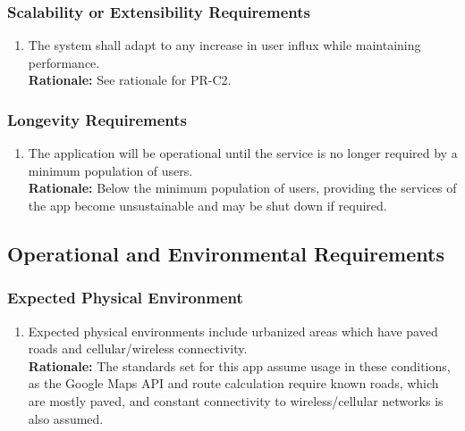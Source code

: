 \documentclass[]{article}
\begin{document}
\subsubsection{Scalability or Extensibility Requirements}
\label{ssub:scalability_or_extensibility_requirements}
\begin{enumerate}[{PR-SE}1. ]
	\item The system shall adapt to any increase in user influx while maintaining performance.\\
	{\bf Rationale:} See rationale for PR-C2.
\end{enumerate}

\subsubsection{Longevity Requirements}
\label{ssub:longevity_requirements}
\begin{enumerate}[{PR-L}1. ]
	\item The application will be operational until the service is no longer required by a minimum population of users.\\
	{\bf Rationale:} Below the minimum population of users, providing the services of the app become unsustainable and may be shut down if required.
\end{enumerate}


\subsection{Operational and Environmental Requirements}
\label{sub:operational_and_environmental_requirements}

\subsubsection{Expected Physical Environment}
\label{ssub:expected_physical_environment}
\begin{enumerate}[{OE-EPE}1. ]
	\item Expected physical environments include urbanized areas which have paved roads and cellular/wireless connectivity.\\
	{\bf Rationale:} The standards set for this app assume usage in these conditions, as the Google Maps API and route calculation require known roads, which are mostly paved, and constant connectivity to wireless/cellular networks is also assumed. 
\end{enumerate}
\end{document}
